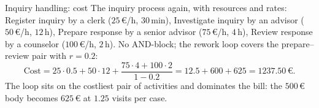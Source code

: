 \begin{examplebox}{Inquiry handling: cost}
The inquiry process again, with resources and rates: Register inquiry by a clerk ($25\,\euro$/h, $30$\,min), Investigate inquiry by an advisor ($50\,\euro$/h, $12$\,h), Prepare response by a senior advisor ($75\,\euro$/h, $4$\,h), Review response by a counselor ($100\,\euro$/h, $2$\,h). No AND-block; the rework loop covers the prepare--review pair with $r = 0.2$:
$$\text{Cost} = 25 \cdot 0.5 + 50 \cdot 12 + \frac{75 \cdot 4 + 100 \cdot 2}{1 - 0.2} = 12.5 + 600 + 625 = 1237.50\,\euro.$$
The loop sits on the costliest pair of activities and dominates the bill: the $500\,\euro$ body becomes $625\,\euro$ at $1.25$ visits per case.
\end{examplebox}
